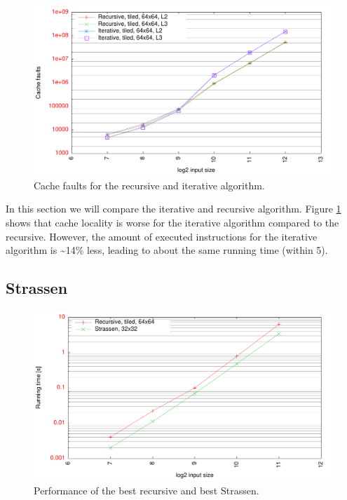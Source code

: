 \begin{figure}[h!]
  \centering
  \includegraphics[width=\textwidth]{"../project2/gnuplots/iterative_cache"}
  \caption{Cache faults for the recursive and iterative algorithm.}
  \label{fig:iterative_cache}
\end{figure}

In this section we will compare the iterative and recursive algorithm. Figure \ref{fig:iterative_cache} shows that cache locality is worse for the iterative algorithm compared to the recursive. However, the amount of executed instructions for the iterative algorithm is \textasciitilde 14\% less, leading to about the same running time (within 5\permil).

\subsection{Strassen}

\begin{figure}[h!]
  \centering
  \includegraphics[width=\textwidth]{"../project2/gnuplots/recursive_vs_strassen_performance"}
  \caption{Performance of the best recursive and best Strassen.}
  \label{fig:recursive_vs_strassen_performance}
\end{figure}

